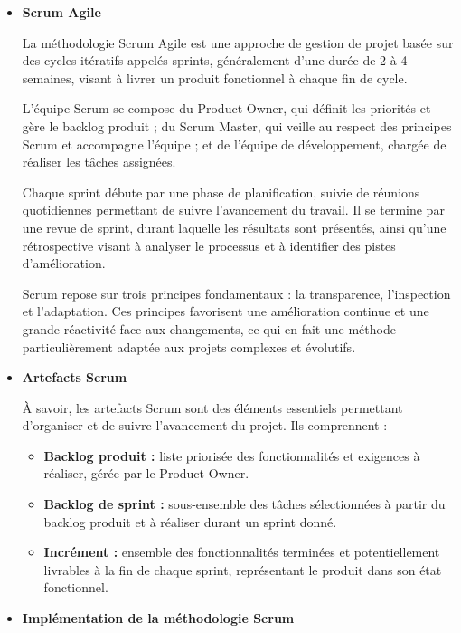 \begin{itemize}

    \item \textbf{Scrum Agile}

    La méthodologie Scrum Agile est une approche de gestion de projet basée sur des cycles itératifs appelés sprints, généralement d’une durée de 2 à 4 semaines, visant à livrer un produit fonctionnel à chaque fin de cycle.

    L’équipe Scrum se compose du Product Owner, qui définit les priorités et gère le backlog produit ; du Scrum Master, qui veille au respect des principes Scrum et accompagne l’équipe ; et de l’équipe de développement, chargée de réaliser les tâches assignées.

    Chaque sprint débute par une phase de planification, suivie de réunions quotidiennes permettant de suivre l’avancement du travail. Il se termine par une revue de sprint, durant laquelle les résultats sont présentés, ainsi qu’une rétrospective visant à analyser le processus et à identifier des pistes d’amélioration.

    Scrum repose sur trois principes fondamentaux : la transparence, l’inspection et l’adaptation. Ces principes favorisent une amélioration continue et une grande réactivité face aux changements, ce qui en fait une méthode particulièrement adaptée aux projets complexes et évolutifs.

    \item \textbf{Artefacts Scrum}

    À savoir, les artefacts Scrum sont des éléments essentiels permettant d’organiser et de suivre l’avancement du projet. Ils comprennent :

    \begin{itemize}
        \item \textbf{Backlog produit :} liste priorisée des fonctionnalités et exigences à réaliser, gérée par le Product Owner.
        
        \item \textbf{Backlog de sprint :} sous-ensemble des tâches sélectionnées à partir du backlog produit et à réaliser durant un sprint donné.
        
        \item \textbf{Incrément :} ensemble des fonctionnalités terminées et potentiellement livrables à la fin de chaque sprint, représentant le produit dans son état fonctionnel.
    \end{itemize}

    \item \textbf{Implémentation de la méthodologie Scrum}


\end{itemize}
